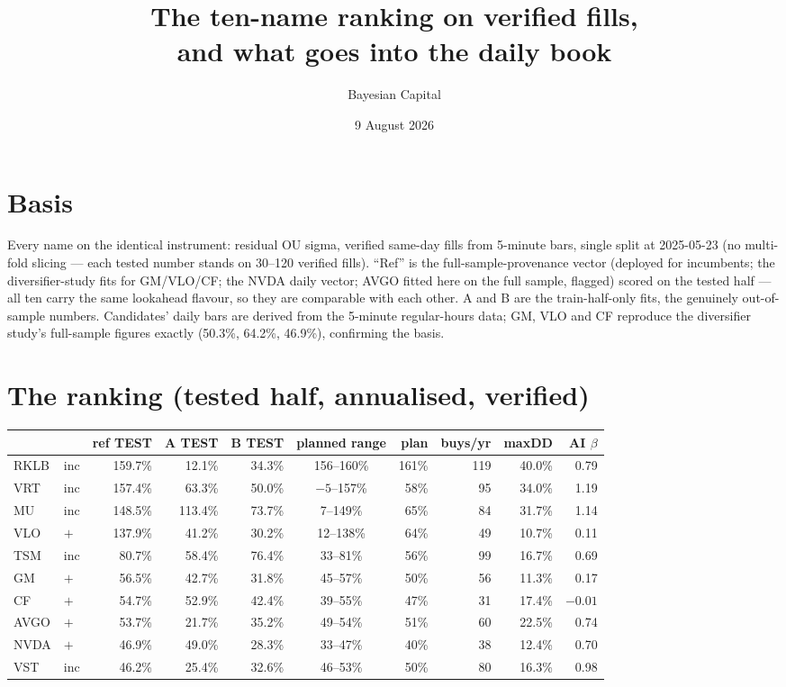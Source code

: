 \documentclass[11pt,a4paper]{article}
\title{The ten-name ranking on verified fills,\\
\large and what goes into the daily book}
\author{Bayesian Capital}
\date{9 August 2026}
\begin{document}
\maketitle

\section*{Basis}

Every name on the identical instrument: residual OU sigma, verified same-day fills
from 5-minute bars, single split at 2025-05-23 (no multi-fold slicing --- each tested
number stands on 30--120 verified fills). ``Ref'' is the full-sample-provenance vector
(deployed for incumbents; the diversifier-study fits for GM/VLO/CF; the NVDA daily
vector; AVGO fitted here on the full sample, flagged) scored on the tested half ---
all ten carry the same lookahead flavour, so they are comparable with each other.
A and B are the train-half-only fits, the genuinely out-of-sample numbers.
Candidates' daily bars are derived from the 5-minute regular-hours data; GM, VLO and
CF reproduce the diversifier study's full-sample figures exactly (50.3\%, 64.2\%,
46.9\%), confirming the basis.

\section*{The ranking (tested half, annualised, verified)}

\begin{center}
\begin{tabular}{llrrrcrrrr}
\toprule
 & & ref TEST & A TEST & B TEST & planned range & plan & buys/yr & maxDD & AI $\beta$ \\
\midrule
RKLB & inc & 159.7\% & 12.1\% & 34.3\% & 156--160\% & 161\% & 119 & 40.0\% & 0.79 \\
VRT  & inc & 157.4\% & 63.3\% & 50.0\% & $-5$--157\% & 58\% &  95 & 34.0\% & 1.19 \\
MU   & inc & 148.5\% & 113.4\% & 73.7\% & 7--149\% & 65\% & 84 & 31.7\% & 1.14 \\
VLO  & $+$ & 137.9\% & 41.2\% & 30.2\% & 12--138\% & 64\% &  49 & 10.7\% & 0.11 \\
TSM  & inc &  80.7\% & 58.4\% & 76.4\% & 33--81\% & 56\% &  99 & 16.7\% & 0.69 \\
GM   & $+$ &  56.5\% & 42.7\% & 31.8\% & 45--57\% & 50\% &  56 & 11.3\% & 0.17 \\
CF   & $+$ &  54.7\% & 52.9\% & 42.4\% & 39--55\% & 47\% &  31 & 17.4\% & $-0.01$ \\
AVGO & $+$ &  53.7\% & 21.7\% & 35.2\% & 49--54\% & 51\% &  60 & 22.5\% & 0.74 \\
NVDA & $+$ &  46.9\% & 49.0\% & 28.3\% & 33--47\% & 40\% &  38 & 12.4\% & 0.70 \\
VST  & inc &  46.2\% & 25.4\% & 32.6\% & 46--53\% & 50\% &  80 & 16.3\% & 0.98 \\
\bottomrule
\end{tabular}
\end{center}
\end{document}
